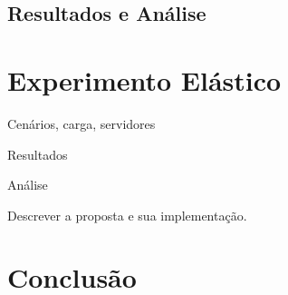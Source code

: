 \subsection{Resultados e Análise}


\section{Experimento Elástico}\label{sec:experimento_replicas_leitoras}

Cenários, carga, servidores

Resultados

Análise


Descrever a proposta e sua implementação.

\section{Conclusão}\label{sec:conclusao}

